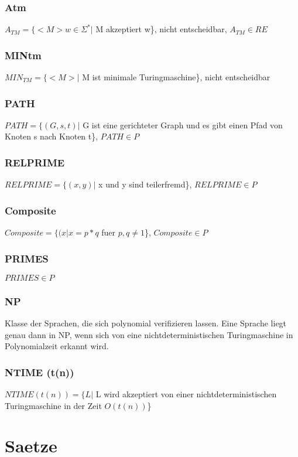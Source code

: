 \documentclass[a4paper]{scrreprt}
\begin{document}
\subsubsection{Atm} $A_{TM} = \{<M> w \in \Sigma^*|$ M akzeptiert w\}, nicht entscheidbar, $A_{TM} \in RE$
\subsubsection{MINtm} $MIN_{TM} = \{<M>|$ M ist minimale Turingmaschine\}, nicht entscheidbar
\subsubsection{PATH} $PATH = \{(G, s, t)|$ G ist eine gerichteter Graph und es gibt einen Pfad von Knoten s nach Knoten t\}, $PATH \in P$
\subsubsection{RELPRIME} $RELPRIME = \{(x, y)|$ x und y sind teilerfremd\}, $RELPRIME \in P$
\subsubsection{Composite} $Composite = \{(x|x = p * q$ fuer $p,q \neq 1$\}, $Composite \in P$
\subsubsection{PRIMES} $PRIMES \in P$
\subsubsection{NP} Klasse der Sprachen, die sich polynomial verifizieren lassen. Eine Sprache liegt genau dann in NP, wenn sich von eine nichtdeterministischen Turingmaschine in Polynomialzeit erkannt wird.
\subsubsection{NTIME (t(n))} $NTIME (t(n)) = \{L|$ L wird akzeptiert von einer nichtdeterministischen Turingmaschine in der Zeit $O(t(n))$\}



\section{Saetze}
\end{document}
